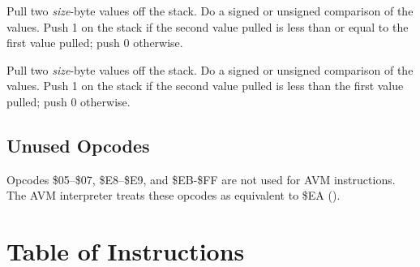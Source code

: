 \documentclass[10pt]{article}
\begin{document}
 Pull two
\emph{size}-byte values off the stack. Do a signed or unsigned
comparison of the values.  Push 1 on the stack if the second value
pulled is less than or equal to the first value pulled; push 0
otherwise.

 Pull two
\emph{size}-byte values off the stack. Do a signed or unsigned
comparison of the values.  Push 1 on the stack if the second value
pulled is less than the first value pulled; push 0 otherwise.

\subsection{Unused Opcodes}

Opcodes \$05--\$07, \$E8--\$E9, and \$EB-\$FF are not used for AVM
instructions.  The AVM interpreter treats these opcodes as equivalent
to \$EA ().

\newpage

\section{Table of Instructions}
\end{document}
